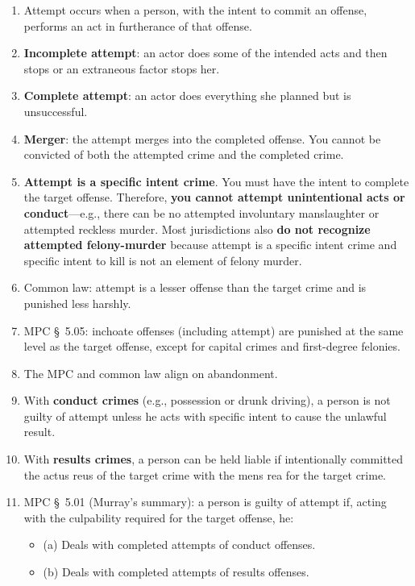 \begin{enumerate}
    \item Attempt occurs when a person, with the intent to commit an offense, 
    performs an act in furtherance of that offense.
    \item \textbf{Incomplete attempt}: an actor does some of the intended acts 
    and then stops or an extraneous factor stops her.
    \item \textbf{Complete attempt}: an actor does everything she planned but 
    is unsuccessful.
    \item \textbf{Merger}: the attempt merges into the completed offense. You 
    cannot be convicted of both the attempted crime and the completed crime.
    \item \textbf{Attempt is a specific intent crime}. You must have the 
    intent to complete the target offense. Therefore, \textbf{you cannot 
    attempt unintentional acts or conduct}---e.g., there can be no attempted 
    involuntary manslaughter or attempted reckless murder. Most jurisdictions 
    also \textbf{do not recognize attempted felony-murder} because attempt is 
    a specific intent crime and specific intent to kill is not an element of 
    felony murder.
    \item Common law: attempt is a lesser offense than the target crime and is 
    punished less harshly.
    \item MPC \S\ 5.05: inchoate offenses (including attempt) are punished at 
    the same level as the target offense, except for capital crimes and 
    first-degree felonies.
    \item The MPC and common law align on abandonment. 
    \item With \textbf{conduct crimes} (e.g., possession or drunk driving), a 
    person is not guilty of attempt unless he acts with specific intent to 
    cause the unlawful result.
    \item With \textbf{results crimes}, a person can be held liable if 
    intentionally committed the actus reus of the target crime with the mens 
    rea for the target crime. 
    \item MPC \S\ 5.01 (Murray's summary): a person is guilty of attempt if, 
    acting with the culpability required for the target offense, he:
    \begin{itemize}
        \item (a) Deals with completed attempts of conduct offenses.
        \item (b) Deals with completed attempts of results offenses.

\end{itemize}
\end{enumerate}
